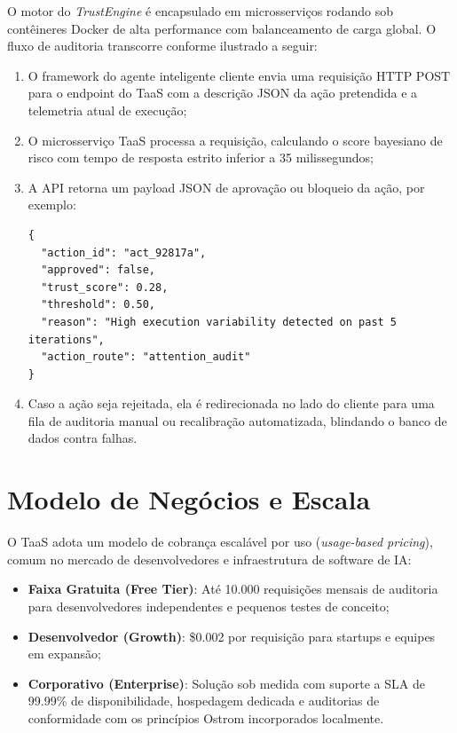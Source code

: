 \documentclass[12pt,a4paper,oneside]{abntex2}
\begin{document}
\begin{apendicesenv}
O motor do \textit{TrustEngine} é encapsulado em microsserviços rodando sob contêineres Docker de alta performance com balanceamento de carga global. O fluxo de auditoria transcorre conforme ilustrado a seguir:

\begin{enumerate}
    \item O framework do agente inteligente cliente envia uma requisição HTTP POST para o endpoint do TaaS com a descrição JSON da ação pretendida e a telemetria atual de execução;
    \item O microsserviço TaaS processa a requisição, calculando o score bayesiano de risco com tempo de resposta estrito inferior a 35 milissegundos;
    \item A API retorna um payload JSON de aprovação ou bloqueio da ação, por exemplo:
    \begin{lstlisting}[basicstyle=\ttfamily\footnotesize]
{
  "action_id": "act_92817a",
  "approved": false,
  "trust_score": 0.28,
  "threshold": 0.50,
  "reason": "High execution variability detected on past 5 iterations",
  "action_route": "attention_audit"
}
    \end{lstlisting}
    \item Caso a ação seja rejeitada, ela é redirecionada no lado do cliente para uma fila de auditoria manual ou recalibração automatizada, blindando o banco de dados contra falhas.
\end{enumerate}

\section{Modelo de Negócios e Escala}

O TaaS adota um modelo de cobrança escalável por uso (\textit{usage-based pricing}), comum no mercado de desenvolvedores e infraestrutura de software de IA:
\begin{itemize}
    \item \textbf{Faixa Gratuita (Free Tier)}: Até 10.000 requisições mensais de auditoria para desenvolvedores independentes e pequenos testes de conceito;
    \item \textbf{Desenvolvedor (Growth)}: \$0.002 por requisição para startups e equipes em expansão;
    \item \textbf{Corporativo (Enterprise)}: Solução sob medida com suporte a SLA de 99.99\% de disponibilidade, hospedagem dedicada e auditorias de conformidade com os princípios Ostrom incorporados localmente.
\end{itemize}

\end{apendicesenv}
\end{document}
